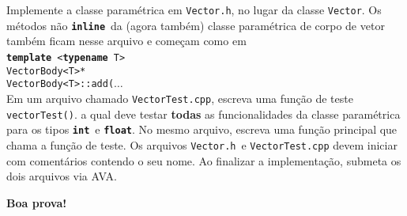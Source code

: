 \documentclass[12pt]{article}
\newcommand{\kw}[1]{{\color{myblue}\texttt{\textbf{#1}}}}
\newcommand{\sym}[1]{{\color{mygreen}\texttt{#1}}}
\newcommand{\hfile}[1]{{\color{myorange}\texttt{#1.h}}}
\newcommand{\cfile}[1]{{\color{myorange}\texttt{#1.cpp}}}
\begin{document}
Implemente a classe paramétrica em \hfile{Vector}, no lugar da classe \sym{Vector}. Os métodos não \kw{inline}\ da (agora também) classe paramétrica de corpo de vetor também ficam nesse arquivo e começam como em\\[1.5ex]
\kw{template}\ \texttt{<}\kw{typename}\ \sym{T}\texttt{>}\\
\sym{VectorBody}\texttt{<}\sym{T}\texttt{>*}\\
\sym{VectorBody}\texttt{<}\sym{T}\texttt{>::add(}$\ldots$\\[1.5ex]
Em um arquivo chamado \cfile{VectorTest}, escreva uma função de teste \texttt{vectorTest()}. a qual deve testar \textbf{todas} as funcionalidades da classe paramétrica para os tipos \kw{int}\ e \kw{float}. No mesmo arquivo, escreva uma função principal que chama a função de teste. Os arquivos \hfile{Vector}\ e \cfile{VectorTest} devem iniciar com comentários contendo o seu nome. Ao finalizar a implementação, submeta os dois arquivos via AVA.

\vspace{1cm}
\centerline{\bf Boa prova!}
\end{document}
